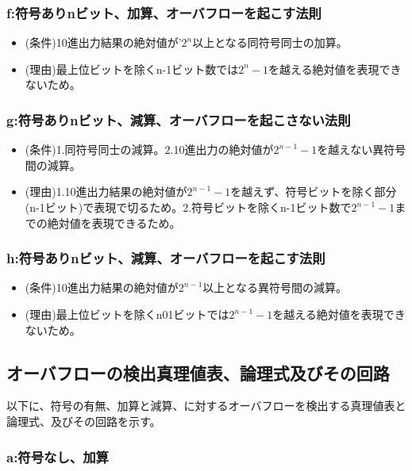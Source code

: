 \documentclass[11pt,a4j]{jsarticle}
\begin{document}
    \subsubsection{f:符号ありnビット、加算、オーバフローを起こす法則}
    \begin{itemize}
     \item (条件)10進出力結果の絶対値が'$2^n$以上となる同符号同士の加算。
     \item (理由)最上位ビットを除くn-1ビット数では$2^n-1$を越える絶対値を表現できないため。
     \end{itemize}
    
    \subsubsection{g:符号ありnビット、減算、オーバフローを起こさない法則}
    \begin{itemize}
     \item (条件)1.同符号同士の減算。2.10進出力の絶対値が$2^{n-1}-1$を越えない異符号間の減算。
     \item (理由)1.10進出力結果の絶対値が$2^{n-1}-1$を越えず、符号ビットを除く部分(n-1ビット)で表現で切るため。2.符号ビットを除くn-1ビット数で$2^{n-1}-1$までの絶対値を表現できるため。
     \end{itemize}
    
    \subsubsection{h:符号ありnビット、減算、オーバフローを起こす法則}
    \begin{itemize}
     \item (条件)10進出力結果の絶対値が$2^{n-1}$以上となる異符号間の減算。
     \item (理由)最上位ビットを除くn01ビットでは$2^{n-1}-1$を越える絶対値を表現できないため。
     \end{itemize}
    
   
   
   
   \subsection{オーバフローの検出真理値表、論理式及びその回路}
   以下に、符号の有無、加算と減算、に対するオーバフローを検出する真理値表と論理式、及びその回路を示す。
    \subsubsection{a:符号なし、加算}
    
\end{document}
